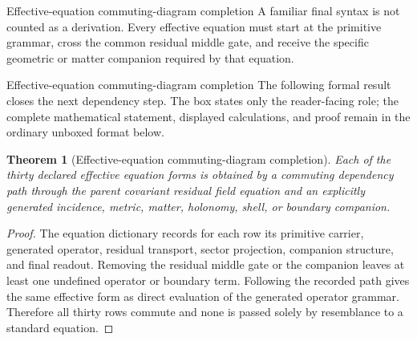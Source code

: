 \documentclass[11pt]{article}
\numberwithin{equation}{section}
\newtheorem{theorem}[definition]{Theorem}
\theoremstyle{remark}
\begin{document}
\begin{proofguide}{Effective-equation commuting-diagram completion}
A familiar final syntax is not counted as a derivation. Every effective equation must start at the primitive grammar, cross the common residual middle gate, and receive the specific geometric or matter companion required by that equation.
\end{proofguide}
\begin{proofguide}{Effective-equation commuting-diagram completion}
The following formal result closes the next dependency step. The box states only the reader-facing role; the complete mathematical statement, displayed calculations, and proof remain in the ordinary unboxed format below.
\end{proofguide}
\begin{theorem}[Effective-equation commuting-diagram completion]
Each of the thirty declared effective equation forms is obtained by a commuting dependency path through the parent covariant residual field equation and an explicitly generated incidence, metric, matter, holonomy, shell, or boundary companion.
\end{theorem}
\begin{proof}
The equation dictionary records for each row its primitive carrier, generated operator, residual transport, sector projection, companion structure, and final readout. Removing the residual middle gate or the companion leaves at least one undefined operator or boundary term. Following the recorded path gives the same effective form as direct evaluation of the generated operator grammar. Therefore all thirty rows commute and none is passed solely by resemblance to a standard equation.
\end{proof}
\end{document}
